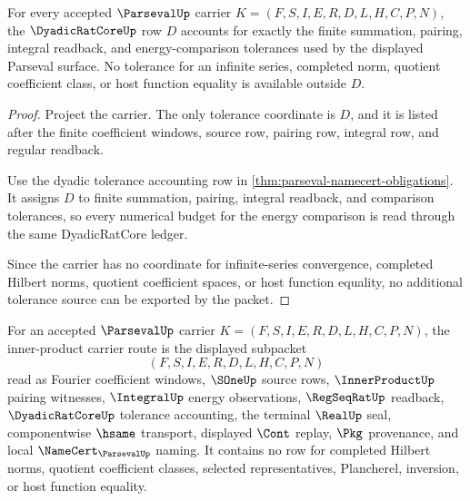 \begin{theorem}
\label{thm:parseval-dyadic-tolerance-ledger}
For every accepted $\ParsevalUp$ carrier $K=(F,S,I,E,R,D,L,H,C,P,N)$, the $\DyadicRatCoreUp$ row $D$ accounts for exactly the finite summation, pairing, integral readback, and energy-comparison tolerances used by the displayed Parseval surface. No tolerance for an infinite series, completed norm, quotient coefficient class, or host function equality is available outside $D$.
\end{theorem}
\begin{proof}
Project the carrier. The only tolerance coordinate is $D$, and it is listed after the finite coefficient windows, source row, pairing row, integral row, and regular readback.

Use the dyadic tolerance accounting row in \autoref{thm:parseval-namecert-obligations}. It assigns $D$ to finite summation, pairing, integral readback, and comparison tolerances, so every numerical budget for the energy comparison is read through the same DyadicRatCore ledger.

Since the carrier has no coordinate for infinite-series convergence, completed Hilbert norms, quotient coefficient spaces, or host function equality, no additional tolerance source can be exported by the packet.
\end{proof}

\begin{definition}
\label{def:parseval-inner-product-carrier}
For an accepted $\ParsevalUp$ carrier $K=(F,S,I,E,R,D,L,H,C,P,N)$, the inner-product carrier route is the displayed subpacket
$$
(F,S,I,E,R,D,L,H,C,P,N)
$$
read as Fourier coefficient windows, $\SOneUp$ source rows, $\InnerProductUp$ pairing witnesses, $\IntegralUp$ energy observations, $\RegSeqRatUp$ readback, $\DyadicRatCoreUp$ tolerance accounting, the terminal $\RealUp$ seal, componentwise $\hsame$ transport, displayed $\Cont$ replay, $\Pkg$ provenance, and local $\NameCert_{\ParsevalUp}$ naming. It contains no row for completed Hilbert norms, quotient coefficient classes, selected representatives, Plancherel, inversion, or host function equality.
\end{definition}

